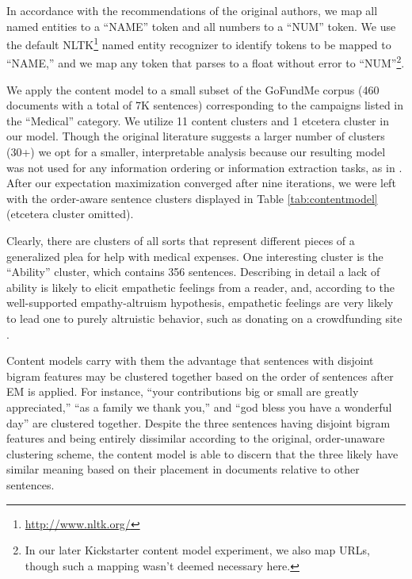 \documentclass[letterpaper]{article}
\begin{document}
In accordance with the recommendations of the original authors, we map all named entities to a ``NAME'' token and all numbers to a ``NUM'' token. We use the default NLTK\footnote{\url{http://www.nltk.org/}} named entity recognizer to identify tokens to be mapped to ``NAME,'' and we map any token that parses to a float without error to ``NUM''\footnote{In our later Kickstarter content model experiment, we also map URLs, though such a mapping wasn't deemed necessary here.}.

We apply the content model to a small subset of the GoFundMe corpus (460 documents with a total of 7K sentences) corresponding to the campaigns listed in the ``Medical'' category. We utilize 11 content clusters and 1 etcetera cluster in our model. Though the original literature suggests a larger number of clusters (30+) we opt for a smaller, interpretable analysis because our resulting model was not used for any information ordering or information extraction tasks, as in \cite{barzilay2004catching}. After our expectation maximization converged after nine iterations, we were left with the order-aware sentence clusters displayed in Table \ref{tab:contentmodel} (etcetera cluster omitted).

Clearly, there are clusters of all sorts that represent different pieces of a generalized plea for help with medical expenses. One interesting cluster is the ``Ability'' cluster, which contains 356 sentences. Describing in detail a lack of ability is likely to elicit empathetic feelings from a reader, and, according to the well-supported empathy-altruism hypothesis, empathetic feelings are very likely to lead one to purely altruistic behavior, such as donating on a crowdfunding site \cite{batson1988five}.

Content models carry with them the advantage that sentences with disjoint bigram features may be clustered together based on the order of sentences after EM is applied. For instance, ``your contributions big or small are greatly appreciated,'' ``as a family we thank you,'' and ``god bless you have a wonderful day'' are clustered together. Despite the three sentences having disjoint bigram features and being entirely dissimilar according to the original, order-unaware clustering scheme, the content model is able to discern that the three likely have similar meaning based on their placement in documents relative to other sentences.
\end{document}
